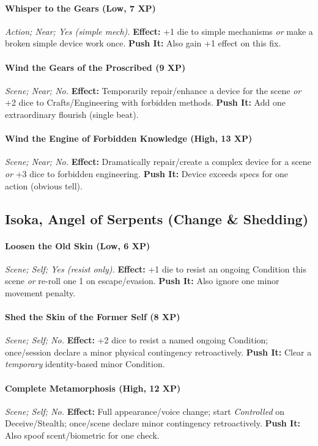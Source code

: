 \documentclass[12pt,twoside]{book}
\begin{document}
\paragraph{Whisper to the Gears (Low, 7 XP)} \emph{Action; Near; Yes (simple mech).}
\textbf{Effect:} +1 die to simple mechanisms \emph{or} make a broken simple device work once.
\textbf{Push It:} Also gain +1 effect on this fix.
\paragraph{Wind the Gears of the Proscribed (9 XP)} \emph{Scene; Near; No.}
\textbf{Effect:} Temporarily repair/enhance a device for the scene \emph{or} +2 dice to Crafts/Engineering with forbidden methods.
\textbf{Push It:} Add one extraordinary flourish (single beat).
\paragraph{Wind the Engine of Forbidden Knowledge (High, 13 XP)} \emph{Scene; Near; No.}
\textbf{Effect:} Dramatically repair/create a complex device for a scene \emph{or} +3 dice to forbidden engineering.
\textbf{Push It:} Device exceeds specs for one action (obvious tell).

\subsection{Isoka, Angel of Serpents (Change \& Shedding)}
\paragraph{Loosen the Old Skin (Low, 6 XP)} \emph{Scene; Self; Yes (resist only).}
\textbf{Effect:} +1 die to resist an ongoing Condition this scene \emph{or} re-roll one 1 on escape/evasion.
\textbf{Push It:} Also ignore one minor movement penalty.
\paragraph{Shed the Skin of the Former Self (8 XP)} \emph{Scene; Self; No.}
\textbf{Effect:} +2 dice to resist a named ongoing Condition; once/session declare a minor physical contingency retroactively.
\textbf{Push It:} Clear a \emph{temporary} identity-based minor Condition.
\paragraph{Complete Metamorphosis (High, 12 XP)} \emph{Scene; Self; No.}
\textbf{Effect:} Full appearance/voice change; start \emph{Controlled} on Deceive/Stealth; once/scene declare minor contingency retroactively.
\textbf{Push It:} Also spoof scent/biometric for one check.
\end{document}
